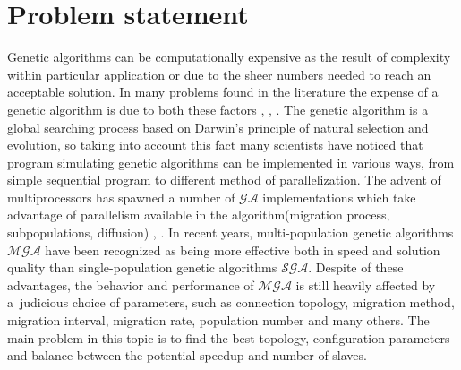 \section{Problem statement}
Genetic algorithms can be computationally expensive as the result of
complexity within particular application or due to the sheer numbers needed to
reach an acceptable solution. In many problems found in the literature the
expense of a genetic algorithm is due to both these factors \cite{bib5},
\cite{bib7}, \cite{bib11}. The genetic algorithm is a global searching process
based on Darwin's principle of natural selection and evolution, so taking into
account this fact many scientists have noticed that program simulating genetic
algorithms can be implemented in various ways, from
simple sequential program to different method of parallelization. The advent of
multiprocessors has spawned a number of $\mathcal{GA}$ implementations which take advantage
of parallelism available in the algorithm(migration process, subpopulations,
diffusion) \cite{bib8}, \cite{bib9}. In recent years, multi-population genetic algorithms $\mathcal{MGA}$ 
have been recognized as being more effective both in speed and solution quality 
than single-population genetic algorithms $\mathcal{SGA}$. Despite of these advantages,
the behavior and performance of $\mathcal{MGA}$ is still heavily 
affected by a~judicious choice of parameters, such as connection topology, 
migration method, migration interval, migration rate, population number and many
others. The main problem in this topic is to find the best topology, configuration
parameters and balance between the potential speedup and number of slaves.
